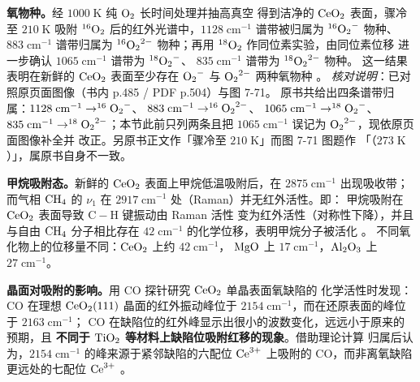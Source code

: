 \begin{obs}
\textbf{氧物种。}经 $1000\;\mathrm{K}$ 纯 $\ce{O2}$ 长时间处理并抽高真空
得到洁净的 $\ce{CeO2}$ 表面，骤冷至 $210\;\mathrm{K}$ 吸附
$^{16}\ce{O2}$ 后的红外光谱中，$1128\;\mathrm{cm^{-1}}$ 谱带被归属为
$^{16}\ce{O2^{-}}$ 物种、$883\;\mathrm{cm^{-1}}$ 谱带归属为
$^{16}\ce{O2^{2-}}$ 物种；再用 $^{18}\ce{O2}$ 作同位素实验，由同位素位移
进一步确认 $1065\;\mathrm{cm^{-1}}$ 谱带为 $^{18}\ce{O2^{-}}$、
$835\;\mathrm{cm^{-1}}$ 谱带为 $^{18}\ce{O2^{2-}}$ 物种。
这一结果表明在新鲜的 $\ce{CeO2}$ 表面至少存在 $\ce{O2^{-}}$ 与
$\ce{O2^{2-}}$ 两种氧物种
。
\emph{核对说明}：已对照原页面图像（书内 p.485 / PDF p.504）与图 7-71。
原书共给出四条谱带归属：$1128\;\mathrm{cm^{-1}}\to^{16}\ce{O2^{-}}$、
$883\;\mathrm{cm^{-1}}\to^{16}\ce{O2^{2-}}$、
$1065\;\mathrm{cm^{-1}}\to^{18}\ce{O2^{-}}$、
$835\;\mathrm{cm^{-1}}\to^{18}\ce{O2^{2-}}$；本节此前只列两条且把
$1065\;\mathrm{cm^{-1}}$ 误记为 $\ce{O2^{2-}}$，现依原页面图像补全并
改正。另原书正文作「骤冷至 $210\;\mathrm{K}$」而图 7-71 图题作
「（$273\;\mathrm{K}$）」，属原书自身不一致。

\textbf{甲烷吸附态。}新鲜的 $\ce{CeO2}$ 表面上甲烷低温吸附后，在
$2875\;\mathrm{cm^{-1}}$ 出现吸收带；而气相 $\ce{CH4}$ 的
$\nu_{1}$ 在 $2917\;\mathrm{cm^{-1}}$ 处（Raman）并无红外活性。即：
甲烷吸附在 $\ce{CeO2}$ 表面导致 $\mathrm{C{-}H}$ 键振动由 Raman 活性
变为红外活性（对称性下降），并且与自由 $\ce{CH4}$ 分子相比存在
$42\;\mathrm{cm^{-1}}$ 的化学位移，表明甲烷分子被活化
。
不同氧化物上的位移量不同：$\ce{CeO2}$ 上约 $42\;\mathrm{cm^{-1}}$，
$\ce{MgO}$ 上 $17\;\mathrm{cm^{-1}}$，$\ce{Al2O3}$ 上
$27\;\mathrm{cm^{-1}}$。

\textbf{晶面对吸附的影响。}用 CO 探针研究 $\ce{CeO2}$ 单晶表面氧缺陷的
化学活性时发现：CO 在理想 $\ce{CeO2}(111)$ 晶面的红外振动峰位于
$2154\;\mathrm{cm^{-1}}$，而在还原表面的峰位于 $2163\;\mathrm{cm^{-1}}$；
CO 在缺陷位的红外峰显示出很小的波数变化，远远小于原来的预期，且
\textbf{不同于 $\ce{TiO2}$ 等材料上缺陷位吸附红移的现象}。借助理论计算
归属后认为，$2154\;\mathrm{cm^{-1}}$ 的峰来源于紧邻缺陷的六配位
$\ce{Ce^{3+}}$ 上吸附的 CO，而非离氧缺陷更远处的七配位 $\ce{Ce^{3+}}$
。
\end{obs}

